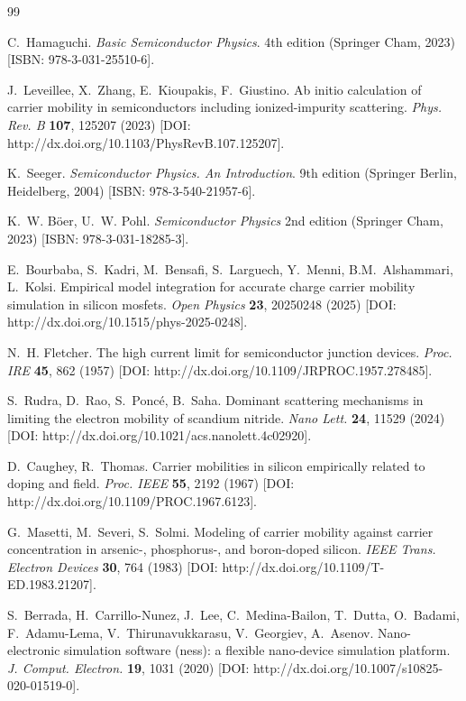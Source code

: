 \documentclass[fleqn,twoside,twocolumn,nofootinbib,showkeys]{revtex4} %
\begin{document}
\begin{thebibliography}{99}                                                                                                %

C.~Hamaguchi. \textit{Basic Semiconductor Physics}. 4th edition (Springer Cham, 2023) [ISBN: 978-3-031-25510-6].

J.~Leveillee, X.~Zhang, E.~Kioupakis, F.~Giustino. Ab initio calculation of carrier mobility in semiconductors including ionized-impurity scattering. \textit{Phys. Rev. B} \textbf{107}, 125207 (2023) [DOI: http://dx.doi.org/10.1103/PhysRevB.107.125207].

K.~Seeger. \textit{Semiconductor Physics. An Introduction}. 9th edition (Springer Berlin, Heidelberg, 2004) [ISBN: 978-3-540-21957-6].

K.~W. B\"oer, U.~W. Pohl. \textit{Semiconductor Physics} 2nd edition (Springer Cham, 2023) [ISBN: 978-3-031-18285-3].

E.~Bourbaba, S.~Kadri, M.~Bensafi, S.~Larguech, Y.~Menni, B.M.~Alshammari, L.~Kolsi. Empirical model integration for accurate charge carrier mobility simulation in silicon mosfets. \textit{Open Physics} \textbf{23}, 20250248 (2025) [DOI: http://dx.doi.org/10.1515/phys-2025-0248].

N.~H. Fletcher. The high current limit for semiconductor junction devices. \textit{Proc. IRE} \textbf{45}, 862 (1957) [DOI: http://dx.doi.org/10.1109/JRPROC.1957.278485].
 
S.~Rudra, D.~Rao, S.~Ponc{\'e}, B.~Saha. Dominant scattering mechanisms in limiting the electron mobility of scandium nitride. \textit{Nano Lett.} \textbf{24}, 11529 (2024) [DOI: http://dx.doi.org/10.1021/acs.nanolett.4c02920].

D.~Caughey, R.~Thomas. Carrier mobilities in silicon empirically related to doping and field. \textit{Proc. IEEE} \textbf{55}, 2192 (1967) [DOI: http://dx.doi.org/10.1109/PROC.1967.6123].

G.~Masetti, M.~Severi, S.~Solmi. Modeling of carrier mobility against carrier concentration in arsenic-, phosphorus-, and boron-doped silicon. \textit{IEEE Trans. Electron Devices} \textbf{30}, 764 (1983) [DOI: http://dx.doi.org/10.1109/T-ED.1983.21207].

S.~Berrada, H.~Carrillo-Nunez, J.~Lee, C.~Medina-Bailon, T.~Dutta, O.~Badami, F.~Adamu-Lema, V.~Thirunavukkarasu, V.~Georgiev, A.~Asenov. Nano-electronic simulation software (ness): a flexible nano-device simulation platform. \textit{J. Comput. Electron.} \textbf{19}, 1031 (2020) [DOI: http://dx.doi.org/10.1007/s10825-020-01519-0].


\end{thebibliography}
\end{document}
